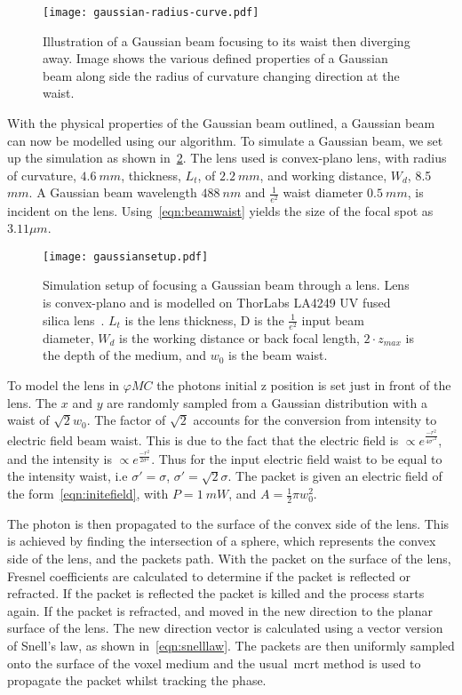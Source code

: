 \begin{figure}[!ht]
    \centering
    \texttt{[image: gaussian-radius-curve.pdf]}
    \caption{Illustration of a Gaussian beam focusing to its waist then diverging away. Image shows the various defined properties of a Gaussian beam along side the radius of curvature changing direction at the waist.}
    \label{fig:gbeamills}
\end{figure}

With the physical properties of the Gaussian beam outlined, a Gaussian beam can now be modelled using our algorithm.
To simulate a Gaussian beam, we set up the simulation as shown in~\cref{fig:gausssetup}.
The lens used is convex-plano lens, with radius of curvature, $4.6~mm$, thickness, $L_t$, of $2.2~mm$, and working distance, $W_d$, 8.5~$mm$.
A Gaussian beam wavelength $488~nm$ and $\tfrac{1}{e^2}$ waist diameter $0.5~mm$, is incident on the lens.
Using~\cref{eqn:beamwaist} yields the size of the focal spot as $3.11\mu m$.

\begin{figure}[!ht]
    \centering
    \texttt{[image: gaussiansetup.pdf]}
    \caption{Simulation setup of focusing a Gaussian beam through a lens. Lens is convex-plano and is modelled on ThorLabs LA4249 UV fused silica lens~\cite{thorlens}.  $L_t$ is the lens thickness, D is the $\tfrac{1}{e^2}$ input beam diameter, $W_d$ is the working distance or back focal length, $2 \cdot z_{max}$ is the depth of the medium, and $w_0$ is the beam waist.}
    \label{fig:gausssetup}
\end{figure}

To model the lens in $\varphi MC$ the photons initial z position is set just in front of the lens.
The $x$ and $y$ are randomly sampled from a Gaussian distribution with a waist of $\sqrt{2}w_0$.
The factor of $\sqrt{2}$ accounts for the conversion from intensity to electric field beam waist.
This is due to the fact that the electric field is $\propto e^{\tfrac{-r^2}{4\sigma'^2}}$, and the intensity is $\propto e^{\tfrac{-r^2}{2\sigma^2}}$.
Thus for the input electric field waist to be equal to the intensity waist, i.e $\sigma'=\sigma$, $\sigma'=\sqrt{2}\sigma$.
The packet is given an electric field of the form~\cref{eqn:initefield}, with $P=1~mW$, and $A=\tfrac{1}{2}\pi w_0^2$.

The photon is then propagated to the surface of the convex side of the lens.
This is achieved by finding the intersection of a sphere, which represents the convex side of the lens, and the packets path.
With the packet on the surface of the lens, Fresnel coefficients are calculated to determine if the packet is reflected or refracted.
If the packet is reflected the packet is killed and the process starts again.
If the packet is refracted, and moved in the new direction to the planar surface of the lens.
The new direction vector is calculated using a vector version of Snell's law, as shown in~\cref{eqn:snelllaw}.
The packets are then uniformly sampled onto the surface of the voxel medium and the usual~\gls*{mcrt} method is used to propagate the packet whilst tracking the phase.

